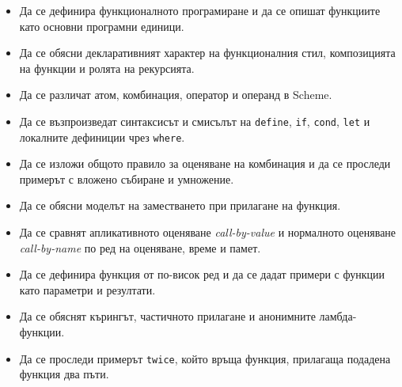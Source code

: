 \begin{itemize}
    \item Да се дефинира функционалното програмиране и да се опишат функциите като основни програмни единици.
    \item Да се обясни декларативният характер на функционалния стил, композицията на функции и ролята на рекурсията.
    \item Да се различат атом, комбинация, оператор и операнд в Scheme.
    \item Да се възпроизведат синтаксисът и смисълът на \texttt{define}, \texttt{if}, \texttt{cond}, \texttt{let} и локалните дефиниции чрез \texttt{where}.
    \item Да се изложи общото правило за оценяване на комбинация и да се проследи примерът с вложено събиране и умножение.
    \item Да се обясни моделът на заместването при прилагане на функция.
    \item Да се сравнят апликативното оценяване \textit{call-by-value} и нормалното оценяване \textit{call-by-name} по ред на оценяване, време и памет.
    \item Да се дефинира функция от по-висок ред и да се дадат примери с функции като параметри и резултати.
    \item Да се обяснят кърингът, частичното прилагане и анонимните ламбда-функции.
    \item Да се проследи примерът \texttt{twice}, който връща функция, прилагаща подадена функция два пъти.
\end{itemize}
